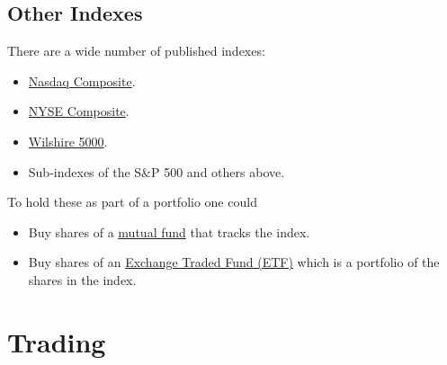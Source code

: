 \documentclass[letterpaper,10pt,english]{sphinxmanual}
\begin{document}
\subsection{Other Indexes}
\label{indexes:other-indexes}
There are a wide number of published indexes:
\begin{itemize}
\item {} 
\href{http://en.wikipedia.org/wiki/Nasdaq\_Composite}{Nasdaq Composite}.

\end{itemize}
\begin{itemize}
\item {} 
\href{http://en.wikipedia.org/wiki/NYSE\_Composite}{NYSE Composite}.

\end{itemize}
\begin{itemize}
\item {} 
\href{http://en.wikipedia.org/wiki/Wilshire\_5000}{Wilshire 5000}.

\end{itemize}
\begin{itemize}
\item {} 
Sub-indexes of the S\&P 500 and others above.

\end{itemize}

To hold these as part of a portfolio one could
\begin{itemize}
\item {} 
Buy shares of a \href{http://en.wikipedia.org/wiki/Mutual\_fund}{mutual fund} that tracks the index.

\end{itemize}
\begin{itemize}
\item {} 
Buy shares of an \href{http://en.wikipedia.org/wiki/Exchange-traded\_fund}{Exchange Traded Fund (ETF)} which is a
portfolio of the shares in the index.

\end{itemize}


\section{Trading}
\label{trading:trading}\label{trading::doc}
\end{document}
